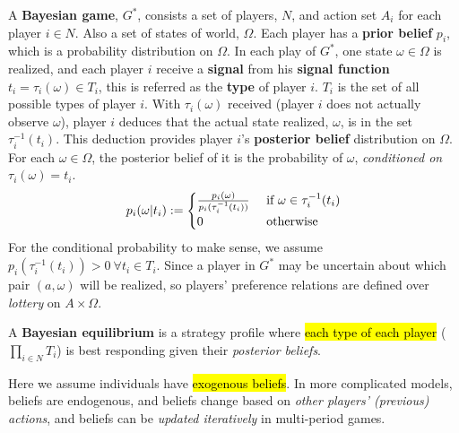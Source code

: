 \documentclass[11pt]{article}
\begin{document}
			\begin{definition}
				A \textbf{Bayesian game}, $G^*$, consists a set of players, $N$, and action set $A_i$ for each player $i \in N$. Also a set of states of world, $\Omega$. Each player has a \textbf{prior belief} $p_i$, which is a probability distribution on $\Omega$.
				In each play of $G^*$, one state $\omega \in \Omega$ is realized, and each player $i$ receive a \textbf{signal} from his \textbf{signal function} $t_i = \tau_i(\omega) \in T_i$, this is referred as the \textbf{type} of player $i$. $T_i$ is the set of all possible types of player $i$. With $\tau_i(\omega)$ received (player $i$ does not actually observe $\omega$), player $i$ deduces that the actual state realized, $\omega$, is in the set $\tau_i^{-1}(t_i)$. This deduction provides player $i$'s \textbf{posterior belief} distribution on $\Omega$. For each $\omega \in \Omega$, the posterior belief of it is the probability of $\omega$, \emph{conditioned on $\tau_i(\omega) = t_i$}.
				\begin{equation}
					p_i(\omega|t_i) := \begin{cases}
						\frac{p_i(\omega)}{p_i(\tau_i^{-1}(t_i))} &\text{{ if }} \omega \in \tau_i^{-1}(t_i) \\
						0 &\text{{ otherwise}}
					\end{cases}
				\end{equation}
				For the conditional probability to make sense, we assume $p_i(\tau_i^{-1}(t_i)) > 0\ \forall t_i \in T_i$. Since a player in $G^*$ may be uncertain about which pair $(a, \omega)$ will be realized, so players' preference relations are defined over \emph{lottery} on $A \times \Omega$.
			\end{definition}
			
			\begin{definition}
				A \textbf{Bayesian equilibrium} is a strategy profile where \hl{each type of each player} ($\prod_{i \in N} T_i$) is best responding given their \emph{posterior beliefs}.
			\end{definition}
			
			\begin{remark}
				Here we assume individuals have \hl{exogenous beliefs}. In more complicated models, beliefs are endogenous, and beliefs change based on \emph{other players' (previous) actions}, and beliefs can be \emph{updated iteratively} in multi-period games.
			\end{remark}
		
\end{document}
